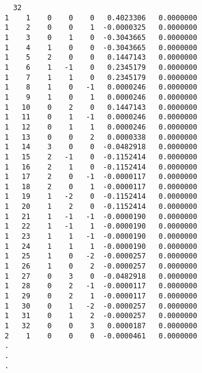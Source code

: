 \begin{verbatim}
      32
    1    1    0    0    0   0.4023306   0.0000000
    1    2    0    0    1  -0.0000325   0.0000000
    1    3    0    1    0  -0.3043665   0.0000000
    1    4    1    0    0  -0.3043665   0.0000000
    1    5    2    0    0   0.1447143   0.0000000
    1    6    1   -1    0   0.2345179   0.0000000
    1    7    1    1    0   0.2345179   0.0000000
    1    8    1    0   -1   0.0000246   0.0000000
    1    9    1    0    1   0.0000246   0.0000000
    1   10    0    2    0   0.1447143   0.0000000
    1   11    0    1   -1   0.0000246   0.0000000
    1   12    0    1    1   0.0000246   0.0000000
    1   13    0    0    2   0.0000338   0.0000000
    1   14    3    0    0  -0.0482918   0.0000000
    1   15    2   -1    0  -0.1152414   0.0000000
    1   16    2    1    0  -0.1152414   0.0000000
    1   17    2    0   -1  -0.0000117   0.0000000
    1   18    2    0    1  -0.0000117   0.0000000
    1   19    1   -2    0  -0.1152414   0.0000000
    1   20    1    2    0  -0.1152414   0.0000000
    1   21    1   -1   -1  -0.0000190   0.0000000
    1   22    1   -1    1  -0.0000190   0.0000000
    1   23    1    1   -1  -0.0000190   0.0000000
    1   24    1    1    1  -0.0000190   0.0000000
    1   25    1    0   -2  -0.0000257   0.0000000
    1   26    1    0    2  -0.0000257   0.0000000
    1   27    0    3    0  -0.0482918   0.0000000
    1   28    0    2   -1  -0.0000117   0.0000000
    1   29    0    2    1  -0.0000117   0.0000000
    1   30    0    1   -2  -0.0000257   0.0000000
    1   31    0    1    2  -0.0000257   0.0000000
    1   32    0    0    3   0.0000187   0.0000000
    2    1    0    0    0  -0.0000461   0.0000000
    .
    .
    .
\end{verbatim}
